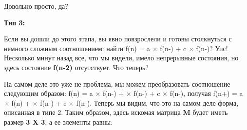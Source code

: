 \vspace{\baselineskip}
Довольно просто, да?

\vspace{\baselineskip}
\textbf{Тип 3:}

\vspace{\baselineskip}
Если вы дошли до этого этапа, вы явно повзрослели и готовы столкнуться с немного сложным соотношением: найти f(n) = a $\times$ f(n-) + c $\times$ f(n-)?\newline 
Упс! Несколько минут назад все, что мы видели, имело непрерывные состояния, но здесь состояние \textbf{f(n-2)} отсутствует. Что теперь?

\vspace{\baselineskip}
На самом деле это уже не проблема, мы можем преобразовать соотношение следующим образом: f(n) = a $\times$ f(n-) +  $\times$ f(n-) + c $\times$ f(n-), получая f(n+) = a $\times$ f(n) +  $\times$ f(n-) + c $\times$ f(n-). Теперь мы видим, что это на самом деле форма, описанная в типе 2. Таким образом, здесь искомая матрица \textbf{M} будет иметь размер \textbf{3 X 3}, а ее элементы равны:


